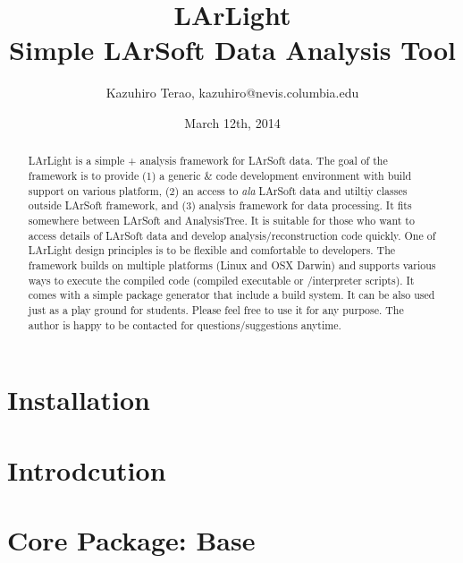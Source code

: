 \documentclass[a4paper,12pt]{report}
\begin{document}
\title{LArLight \\ \vspace{0.1in} Simple LArSoft Data Analysis Tool}
\date{March 12th, 2014}
\author{Kazuhiro Terao, kazuhiro@nevis.columbia.edu}
\maketitle

\begin{abstract}
LArLight is a simple \CPP + \ROOT analysis framework for LArSoft data. The goal of the framework is to provide (1) a generic \CPP \& \ROOT code development environment with build support on various platform, (2) an access to {\it ala} LArSoft data and utiltiy classes outside LArSoft framework, and (3) analysis framework for data processing. It fits somewhere between LArSoft and {\ttfamily AnalysisTree}. It is suitable for those who want to access details of LArSoft data and develop analysis/reconstruction code quickly. One of LArLight design principles is to be flexible and comfortable to developers. The framework builds on multiple platforms (Linux and OSX Darwin) and supports various ways to execute the compiled code (compiled executable or \CINT/\PyROOT interpreter scripts). It comes with a simple package generator that include a build system. It can be also used just as a \CPP play ground for students. Please feel free to use it for any purpose. The author is happy to be contacted for questions/suggestions anytime.
\end{abstract}

\tableofcontents

\newpage
\chapter{Installation}
\label{chap:installation}


\chapter{Introdcution}
\label{chap:introduction}

 
\chapter{Core Package: Base}
\label{chap:base}

\end{document}
